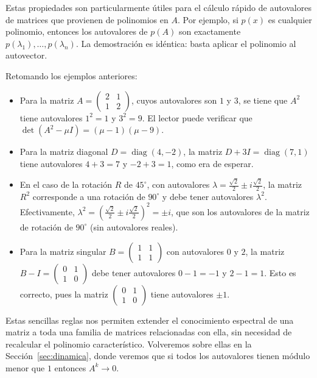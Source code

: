 \begin{remark}
Estas propiedades son particularmente útiles para el cálculo rápido de autovalores de matrices que provienen de polinomios en $A$. Por ejemplo, si $p(x)$ es cualquier polinomio, entonces los autovalores de $p(A)$ son exactamente $p(\lambda_1), \dots, p(\lambda_n)$. La demostración es idéntica: basta aplicar el polinomio al autovector.

Retomando los ejemplos anteriores:
\begin{itemize}
\item Para la matriz $A = \begin{pmatrix}2&1\\1&2\end{pmatrix}$, cuyos autovalores son $1$ y $3$, se tiene que $A^2$ tiene autovalores $1^2=1$ y $3^2=9$. El lector puede verificar que $\det(A^2 - \mu I) = (\mu-1)(\mu-9)$.
\item Para la matriz diagonal $D = \operatorname{diag}(4,-2)$, la matriz $D + 3I = \operatorname{diag}(7,1)$ tiene autovalores $4+3=7$ y $-2+3=1$, como era de esperar.
\item En el caso de la rotación $R$ de $45^\circ$, con autovalores $\lambda = \frac{\sqrt{2}}{2} \pm i\frac{\sqrt{2}}{2}$, la matriz $R^2$ corresponde a una rotación de $90^\circ$ y debe tener autovalores $\lambda^2$. Efectivamente, $\lambda^2 = (\frac{\sqrt{2}}{2} \pm i\frac{\sqrt{2}}{2})^2 = \pm i$, que son los autovalores de la matriz de rotación de $90^\circ$ (sin autovalores reales).
\item Para la matriz singular $B = \begin{pmatrix}1&1\\1&1\end{pmatrix}$ con autovalores $0$ y $2$, la matriz $B - I = \begin{pmatrix}0&1\\1&0\end{pmatrix}$ debe tener autovalores $0-1=-1$ y $2-1=1$. Esto es correcto, pues la matriz $\begin{pmatrix}0&1\\1&0\end{pmatrix}$ tiene autovalores $\pm 1$.
\end{itemize}
\end{remark}

Estas sencillas reglas nos permiten extender el conocimiento espectral de una matriz a
toda una familia de matrices relacionadas con ella, sin necesidad de recalcular el
polinomio característico. Volveremos sobre ellas en la Sección~\ref{sec:dinamica}, donde
veremos que si todos los autovalores tienen módulo menor que $1$ entonces
$A^k\to 0$.

